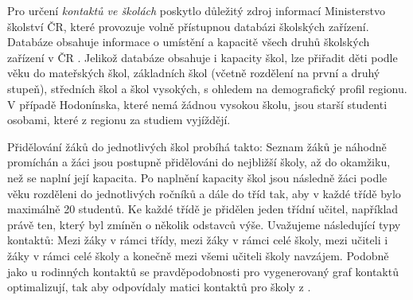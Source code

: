 

Pro určení \emph{kontaktů ve školách} poskytlo důležitý zdroj informací Ministerstvo školství ČR, které provozuje volně přístupnou databázi školských zařízení. Databáze obsahuje informace o umístění a kapacitě všech druhů školských zařízení v ČR \cite{zaj:skolskazarizeni}. Jelikož databáze obsahuje i kapacity škol, lze přiřadit děti podle věku do mateřských škol, základních škol (včetně rozdělení na první a druhý stupeň), středních škol a škol vysokých, s ohledem na demografický profil regionu. V případě Hodonínska, které nemá žádnou vysokou školu, jsou starší studenti osobami, které z regionu za studiem vyjíždějí.

Přidělování žáků do jednotlivých škol probíhá takto: Seznam žáků je náhodně promíchán a žáci jsou postupně přidělováni do nejbližší školy, až do okamžiku, než se naplní její kapacita. Po naplnění kapacity škol jsou následně žáci podle věku rozděleni do jednotlivých ročníků a dále do tříd tak, aby v každé třídě bylo maximálně 20 studentů. Ke každé třídě je přidělen jeden třídní učitel, například právě ten, který byl zmíněn o několik odstavců výše. 
Uvažujeme následující typy kontaktů: Mezi žáky v rámci třídy, mezi žáky v rámci celé školy, mezi učiteli i žáky v rámci celé školy a konečně mezi všemi učiteli školy navzájem.
Podobně jako u rodinných kontaktů se pravděpodobnosti pro vygenerovaný graf kontaktů optimalizují, tak aby odpovídaly matici kontaktů pro školy z \cite{Prem_etal2017}.


